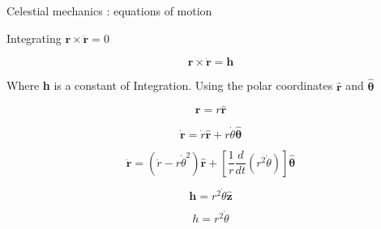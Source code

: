\documentclass{beamer}
\begin{document}
\begin{frame}{Celestial mechanics \cite{murray1999solar}: equations of motion}
\begin{center}
Integrating $\textbf{r} \times \ddot{ \textbf{r}}=0$
\end{center}

\begin{equation}
\textbf{r} \times \dot{ \textbf{r}}=\textbf{h} 
\end{equation}

\begin{center}
Where \textbf{h}  is a constant of Integration. Using the polar coordinates  $\hat{\textbf{r}}$ and $\hat{\boldsymbol{\theta}}$
\end{center}

\begin{equation}
\textbf{r}=r\hat{\textbf{r}}
\end{equation}

\begin{equation}
\dot{\textbf{r}}=\dot{r}\hat{\textbf{r}}+r\dot{\theta}\hat{\boldsymbol{\theta}}
\label{eq_dyn_nop}
\end{equation}

\begin{equation}
\ddot{\textbf{r}}=\left(\ddot{r}-r\dot{\theta}^{2}\right)\hat{\textbf{r}}+\left[\dfrac{1}{r}\frac{d}{dt}\left(r^{2}\dot{\theta}\right)\right]\hat{\boldsymbol{\theta}}
\end{equation}

\begin{equation}
\textbf{h}=r^{2}\dot{\theta}\hat{\textbf{z}}
\end{equation}


\begin{equation}
h=r^{2}\dot{\theta}
\end{equation}

\end{frame}
\end{document}
